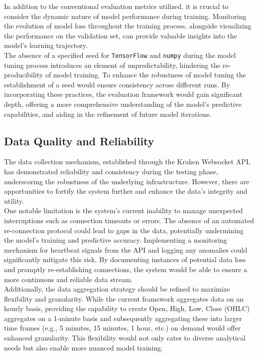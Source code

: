 In addition to the conventional evaluation metrics utilized, it is crucial to consider the dynamic nature of model performance during training. Monitoring the evolution of model loss throughout the training process, alongside visualizing the performance on the validation set, can provide valuable insights into the model's learning trajectory.  \\
The absence of a specified seed for \texttt{TensorFlow} and \texttt{numpy} during the model tuning process introduces an element of unpredictability, hindering the re-producibility of model training. To enhance the robustness of model tuning the establishment of a seed would ensure consistency across different runs. By incorporating these practices, the evaluation framework would gain significant depth, offering a more comprehensive understanding of the model's predictive capabilities, and aiding in the refinement of future model iterations.

\subsection{Data Quality and Reliability}
The data collection mechanism, established through the Kraken Websocket API, has demonstrated reliability and consistency during the testing phase, underscoring the robustness of the underlying infrastructure. However, there are opportunities to fortify the system further and enhance the data's integrity and utility. \\

One notable limitation is the system's current inability to manage unexpected interruptions such as connection timeouts or errors. The absence of an automated re-connection protocol could lead to gaps in the data, potentially undermining the model's training and predictive accuracy. Implementing a monitoring mechanism for heartbeat signals from the API and logging any anomalies could significantly mitigate this risk. By documenting instances of potential data loss and promptly re-establishing connections, the system would be able to ensure a more continuous and reliable data stream. \\

Additionally, the data aggregation strategy should be refined to maximize flexibility and granularity. While the current framework aggregates data on an hourly basis, providing the capability to create Open, High, Low, Close (OHLC) aggregates on a 1-minute basis and subsequently aggregating these into larger time frames (e.g., 5 minutes, 15 minutes, 1 hour, etc.) on demand would offer enhanced granularity. This flexibility would not only cater to diverse analytical needs but also enable more nuanced model training. \\

